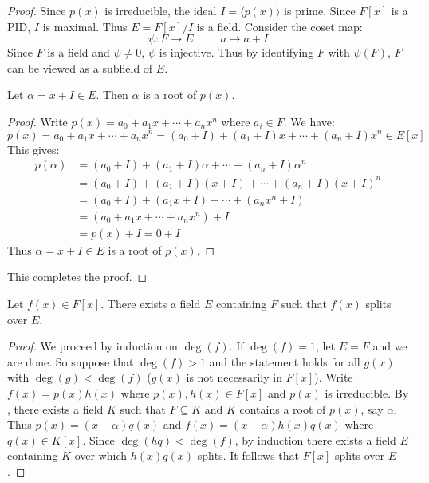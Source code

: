 \documentclass[11pt]{article}
\begin{document}
\begin{proof}
    Since $p(x)$ is irreducible, the ideal $I=\langle p(x)\rangle$ is prime. Since $F[x]$ is a PID, $I$ is maximal. Thus $E=F[x]/I$ is a field. Consider the coset map:
    \[\psi:F\to E,\qquad a\mapsto a+I\]
    Since $F$ is a field and $\psi\neq0$, $\psi$ is injective. Thus by identifying $F$ with $\psi(F)$, $F$ can be viewed as a subfield of $E$.
    \begin{claim}
        Let $\alpha=x+I\in E$. Then $\alpha$ is a root of $p(x)$.
    \end{claim}
    \begin{proof}
        Write $p(x)=a_0+a_1x+\cdots+a_nx^n$ where $a_i\in F$. We have:
        \[p(x)=a_0+a_1x+\cdots+a_nx^n=(a_0+I)+(a_1+I)x+\cdots+(a_n+I)x^n\in E[x]\]
        This gives:
        \begin{align*}
            p(\alpha)&=(a_0+I)+(a_1+I)\alpha+\cdots+(a_n+I)\alpha^n \\
            &=(a_0+I)+(a_1+I)(x+I)+\cdots+(a_n+I)(x+I)^n \\
            &=(a_0+I)+(a_1x+I)+\cdots+(a_nx^n+I) \\
            &=(a_0+a_1x+\cdots+a_nx^n)+I \\
            &=p(x)+I=0+I
        \end{align*}
        Thus $\alpha=x+I\in E$ is a root of $p(x)$.
        
    \end{proof}
    This completes the proof.
    
\end{proof}

\begin{theorem}[Kronecker]
    Let $f(x)\in F[x]$. There exists a field $E$ containing $F$ such that $f(x)$ splits over $E$.
\end{theorem}

\begin{proof}
    We proceed by induction on $\deg(f)$. If $\deg(f)=1$, let $E=F$ and we are done. So suppose that $\deg(f)>1$ and the statement holds for all $g(x)$ with $\deg(g)<\deg(f)$ ($g(x)$ is not necessarily in $F[x]$). Write $f(x)=p(x)h(x)$ where $p(x),h(x)\in F[x]$ and $p(x)$ is irreducible. By , there exists a field $K$ such that $F\subseteq K$ and $K$ contains a root of $p(x)$, say $\alpha$. Thus $p(x)=(x-\alpha)q(x)$ and $f(x)=(x-\alpha)h(x)q(x)$ where $q(x)\in K[x]$. Since $\deg(hq)<\deg(f)$, by induction there exists a field $E$ containing $K$ over which $h(x)q(x)$ splits. It follows that $F[x]$ splits over $E$.
    
\end{proof}
\end{document}
